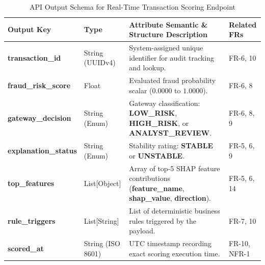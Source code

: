 \documentclass[12pt, a4paper]{report}
\begin{document}
\begin{table}[h]
\centering
\small
\begin{tabularx}{\textwidth}{|R{3.4cm}|R{2.6cm}|X|R{2.2cm}|}
\hline
{}
\textbf{{Output Key}} & \textbf{{Type}} & \textbf{{Attribute Semantic \& Structure Description}} & \textbf{{Related FRs}} \\
\hline
\textbf{transaction\_\allowbreak{}id} & String (UUIDv4) & System-assigned unique identifier for audit tracking and lookup. & FR-6, 10 \\
\hline
\textbf{fraud\_\allowbreak{}risk\_\allowbreak{}score} & Float & Evaluated fraud probability scalar ($0.0000$ to $1.0000$). & FR-6, 8 \\
\hline
\textbf{gateway\_\allowbreak{}decision} & String (Enum) & Gateway classification: \textbf{LOW\_RISK}, \textbf{HIGH\_RISK}, or \textbf{ANALYST\_REVIEW}. & FR-6, 8, 9 \\
\hline
\textbf{explanation\_\allowbreak{}status} & String (Enum) & Stability rating: \textbf{STABLE} or \textbf{UNSTABLE}. & FR-5, 6, 9 \\
\hline
\textbf{top\_\allowbreak{}features} & List[Object] & Array of top-5 SHAP feature contributions (\textbf{feature\_name}, \textbf{shap\_value}, \textbf{direction}). & FR-5, 6, 14 \\
\hline
\textbf{rule\_\allowbreak{}triggers} & List[String] & List of deterministic business rules triggered by the payload. & FR-7, 10 \\
\hline
\textbf{scored\_\allowbreak{}at} & String (ISO 8601) & UTC timestamp recording exact scoring execution time. & FR-10, NFR-1 \\
\hline
\end{tabularx}
\caption{API Output Schema for Real-Time Transaction Scoring Endpoint}
\label{tab:api}
\end{table}
\end{document}
